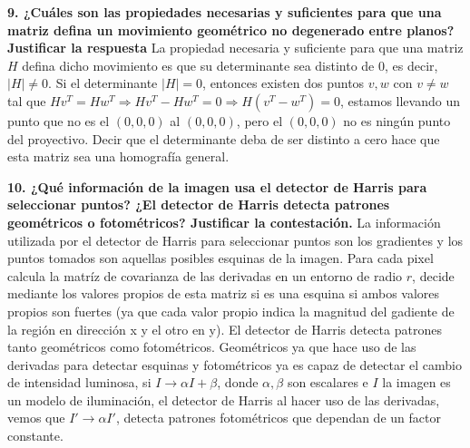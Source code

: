 \documentclass[12pt,a4paper]{article}
\begin{document}
	
	\newpage
	\textbf{9. ¿Cuáles son las propiedades necesarias y suficientes para que una matriz defina un movimiento geométrico no degenerado entre planos? Justificar la respuesta}
	\newline\newline
	La propiedad necesaria y suficiente para que una matriz $H$ defina dicho movimiento es que su determinante sea distinto de $0$, es decir, $\vert H\vert\neq 0$.\newline
	Si el determinante $\vert H\vert = 0$, entonces existen dos puntos $v, w$ con $v \neq w$ tal que $Hv^T = Hw^T\Rightarrow Hv^T-Hw^T=0\Rightarrow H(v^T-w^T)=0$, estamos llevando un punto que no es el $(0,0,0)$ al $(0,0,0)$, pero el $(0,0,0)$ no es ningún punto del proyectivo.\newline
	Decir que el determinante deba de ser distinto a cero hace que esta matriz sea una homografía general.
	
	\newpage
	\textbf{10. ¿Qué información de la imagen usa el detector de Harris para seleccionar puntos? ¿El detector de Harris detecta patrones geométricos o fotométricos? Justificar la contestación.}
	\newline\newline
	La información utilizada por el detector de Harris para seleccionar puntos son los gradientes y los puntos tomados son aquellas posibles esquinas de la imagen. Para cada pixel calcula la matríz de covarianza de las derivadas en un entorno de radio $r$, decide mediante los valores propios de esta matriz si es una esquina si ambos valores propios son fuertes (ya que cada valor propio indica la magnitud del gadiente de la región en dirección x y el otro en y). El detector de Harris detecta patrones tanto geométricos como fotométricos. Geométricos ya que hace uso de las derivadas para detectar esquinas y fotométricos ya es capaz de detectar el cambio de intensidad luminosa, si $I\rightarrow\alpha I + \beta$, donde $\alpha, \beta$ son escalares e $I$ la imagen es un modelo de iluminación, el detector de Harris al hacer uso de las derivadas, vemos que $I'\rightarrow\alpha I'$, detecta patrones fotométricos que dependan de un factor constante.
	
	
	\newpage
	
\end{document}
